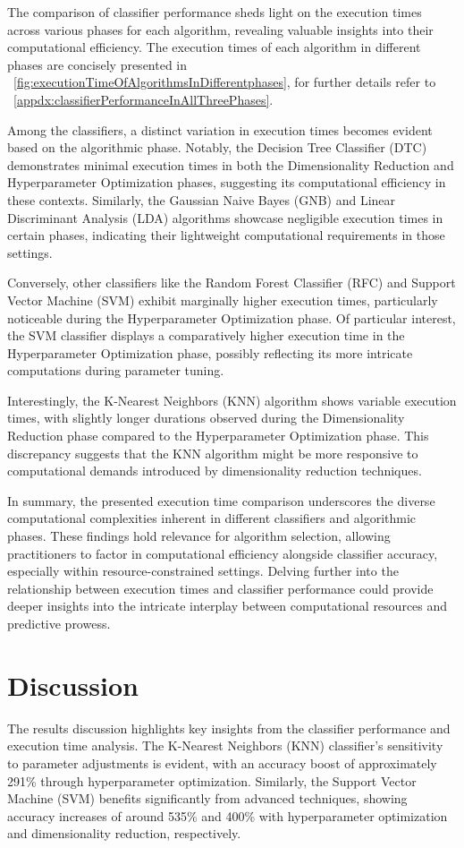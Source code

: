 \documentclass[conference,onecolumn]{IEEEtran}
\begin{document}
    The comparison of classifier performance sheds light on the execution times across various phases for each algorithm, revealing valuable insights into their computational efficiency. The execution times of each algorithm in different phases are concisely presented in \figurename~\ref{fig:executionTimeOfAlgorithmsInDifferentphases}, for further details refer to \tablename~\ref{appdx:classifierPerformanceInAllThreePhases}.

    Among the classifiers, a distinct variation in execution times becomes evident based on the algorithmic phase. Notably, the Decision Tree Classifier (DTC) demonstrates minimal execution times in both the Dimensionality Reduction and Hyperparameter Optimization phases, suggesting its computational efficiency in these contexts. Similarly, the Gaussian Naive Bayes (GNB) and Linear Discriminant Analysis (LDA) algorithms showcase negligible execution times in certain phases, indicating their lightweight computational requirements in those settings.

    Conversely, other classifiers like the Random Forest Classifier (RFC) and Support Vector Machine (SVM) exhibit marginally higher execution times, particularly noticeable during the Hyperparameter Optimization phase. Of particular interest, the SVM classifier displays a comparatively higher execution time in the Hyperparameter Optimization phase, possibly reflecting its more intricate computations during parameter tuning.

    Interestingly, the K-Nearest Neighbors (KNN) algorithm shows variable execution times, with slightly longer durations observed during the Dimensionality Reduction phase compared to the Hyperparameter Optimization phase. This discrepancy suggests that the KNN algorithm might be more responsive to computational demands introduced by dimensionality reduction techniques.

    In summary, the presented execution time comparison underscores the diverse computational complexities inherent in different classifiers and algorithmic phases. These findings hold relevance for algorithm selection, allowing practitioners to factor in computational efficiency alongside classifier accuracy, especially within resource-constrained settings. Delving further into the relationship between execution times and classifier performance could provide deeper insights into the intricate interplay between computational resources and predictive prowess.


\section{Discussion}
    The results discussion highlights key insights from the classifier performance and execution time analysis. The K-Nearest Neighbors (KNN) classifier's sensitivity to parameter adjustments is evident, with an accuracy boost of approximately 291\% through hyperparameter optimization. Similarly, the Support Vector Machine (SVM) benefits significantly from advanced techniques, showing accuracy increases of around 535\% and 400\% with hyperparameter optimization and dimensionality reduction, respectively.
\end{document}
